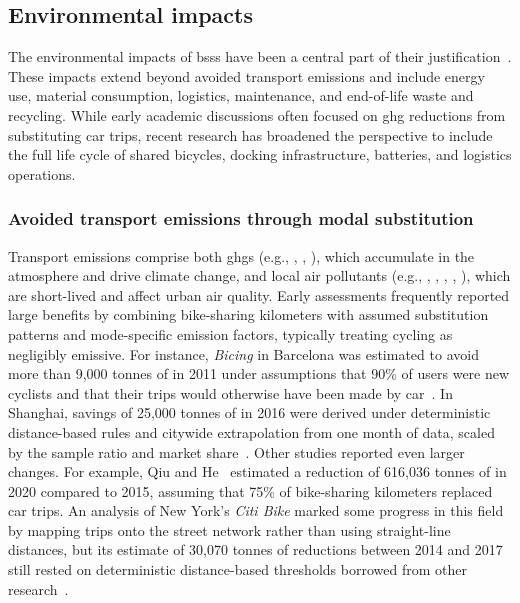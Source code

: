 \subsection{Environmental impacts}

The environmental impacts of \acp{bss} have been a central part of their justification~\cite{Shaheen2010, Fishman2016, Midgley2011}. These impacts extend beyond avoided transport emissions and include energy use, material consumption, logistics, maintenance, and end-of-life waste and recycling. While early academic discussions often focused on \ac{ghg} reductions from substituting car trips, recent research has broadened the perspective to include the full life cycle of shared bicycles, docking infrastructure, batteries, and logistics operations.

    \subsubsection{Avoided transport emissions through modal substitution} 

    Transport emissions comprise both \acp{ghg} (e.g., , , ), which accumulate in the atmosphere and drive climate change, and local air pollutants (e.g., , , , , ), which are short-lived and affect urban air quality. Early assessments frequently reported large benefits by combining bike-sharing kilometers with assumed substitution patterns and mode-specific emission factors, typically treating cycling as negligibly emissive. For instance, \textit{Bicing} in Barcelona was estimated to avoid more than 9,000 tonnes of  in 2011 under assumptions that 90\% of users were new cyclists and that their trips would otherwise have been made by car~\cite{Rojas-Rueda2011}. In Shanghai, savings of 25,000 tonnes of  in 2016 were derived under deterministic distance-based rules and citywide extrapolation from one month of data, scaled by the sample ratio and market share~\cite{Zhang2018}. Other studies reported even larger changes. For example, Qiu and He~\cite{Qiu2018} estimated a reduction of 616,036 tonnes of  in 2020 compared to 2015, assuming that 75\% of bike-sharing kilometers replaced car trips. An analysis of New York’s \textit{Citi Bike} marked some progress in this field by mapping trips onto the street network rather than using straight-line distances, but its estimate of 30,070 tonnes of  reductions between 2014 and 2017 still rested on deterministic distance-based thresholds borrowed from other research~\cite{Chen2022c}.

